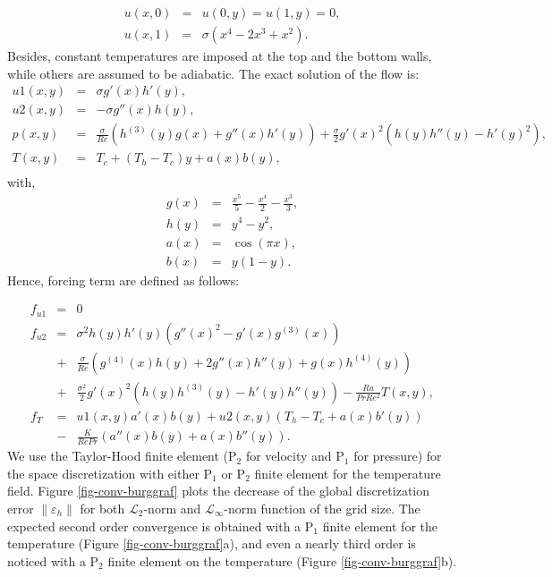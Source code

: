 \begin{eqnarray}
   u(x,0) &=& u(0,y) = u(1,y) = 0, \\
   u(x,1) &=& \sigma (x^4 - 2x^3 + x^2).
\end{eqnarray}
Besides, constant temperatures are imposed at the top and the bottom walls, while others are assumed to be adiabatic.
The exact solution of the flow is:
\begin{eqnarray}
   u1(x,y) &=& \sigma g'(x) h'(y), \\\nonumber
   u2(x,y) &=& - \sigma g''(x) h(y), \\\nonumber
   p(x,y)   &=& \frac{\sigma}{Re} \left( h^{(3)}(y) g(x) + g''(x)h'(y) \right) + \frac{\sigma}{2} g'(x)^2 \left( h(y)h''(y)-h'(y)^2 \right),\\ \nonumber
   T(x,y) &=& T_{c} + (T_{h} - T_{c}) y + a(x) b(y), \\ \nonumber
\end{eqnarray}
with,
\begin{eqnarray}
   g(x) &=& \frac{x^5}{5} - \frac{x^4}{2} - \frac{x^3}{3}, \\ \nonumber
   h(y) &=& y^4 - y^2, \\ \nonumber
   a(x) &=& \cos (\pi x), \\ \nonumber
   b(x) &=& y(1-y).
\end{eqnarray}
Hence, forcing term are defined as follows:

\begin{eqnarray}
   f_{u1} &=& 0 \\ \nonumber
   f_{u2} &=& \sigma^2 h(y) h'(y) \left( g''(x)^2 - g'(x)g^{(3)}(x) \right) \\ \nonumber
   &+& \frac{\sigma}{Re}\left( g^{(4)}(x) h(y) + 2 g''(x)h''(y) + g(x) h^{(4)}(y) \right) \\ \nonumber
   &+& \frac{\sigma^2}{2} g'(x)^2 \left( h(y) h^{(3)}(y) - h'(y)h''(y) \right) - \frac{Ra}{Pr Re^2} T(x,y),\\ \nonumber
   f_T &=& u1(x,y) a'(x) b(y) + u2(x,y) \left( T_h - T_c + a(x) b'(y) \right) \\ \nonumber
   &-& \frac{K}{Re Pr} \left( a''(x)b(y) + a(x) b''(y) \right).
\end{eqnarray}
We use the Taylor-Hood finite element (P$_2$ for velocity and P$_1$ for pressure) for the space discretization with either P$_1$ or P$_2$ finite element for the temperature field.
Figure \ref{fig-conv-burggraf} plots the decrease of the global discretization error $\| \varepsilon_h \|$ for both $\mathcal{L}_2$-norm and $\mathcal{L}_\infty$-norm function of the grid size.
The expected second order convergence is obtained with a P$_1$ finite element for the temperature (Figure \ref{fig-conv-burggraf}a), and even a nearly third order is noticed with a P$_2$ finite element on the temperature (Figure \ref{fig-conv-burggraf}b).

